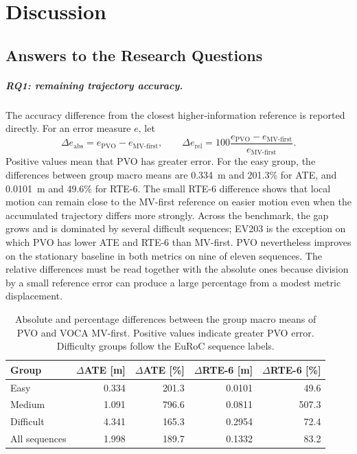 
\chapter{Discussion}\label{chapter:discussion}

\section{Answers to the Research Questions}

\paragraph{RQ1: remaining trajectory accuracy.}
The accuracy difference from the closest higher-information reference is
reported directly. For an error measure $e$, let
\begin{equation}
  \Delta e_{\mathrm{abs}} = e_{\mathrm{PVO}}-e_{\mathrm{MV\text{-}first}},
  \qquad
  \Delta e_{\mathrm{rel}} =
  100\frac{e_{\mathrm{PVO}}-e_{\mathrm{MV\text{-}first}}}
  {e_{\mathrm{MV\text{-}first}}}.
  \label{eq:pvo-reference-error-difference}
\end{equation}
Positive values mean that PVO has greater error. For the easy group, the
differences between group macro means are \SI{0.334}{\metre} and 201.3\% for ATE, and
\SI{0.0101}{\metre} and 49.6\% for RTE-6. The small RTE-6 difference shows that
local motion can remain close to the MV-first reference on easier motion even
when the accumulated trajectory differs more strongly. Across the benchmark,
the gap grows and is dominated by several difficult sequences; EV203 is the
exception on which PVO has lower ATE and RTE-6 than MV-first. PVO nevertheless
improves on the stationary baseline in both metrics on nine of eleven
sequences. The relative differences must be read together with the absolute
ones because division by a small reference error can produce a large
percentage from a modest metric displacement.

\begin{table}[htbp]
  \centering
  \caption[Trajectory-error differences between PVO and VOCA MV-first]{Absolute and percentage differences between the group macro means
  of PVO and VOCA MV-first. Positive values indicate greater PVO error.
  Difficulty groups follow the EuRoC sequence labels.}
  \label{tab:pvo-mv-first-error-differences}
  \begin{tabular}{@{}lrrrr@{}}
    \toprule
    Group & $\Delta$ATE [m] & $\Delta$ATE [\%] & $\Delta$RTE-6 [m] & $\Delta$RTE-6 [\%] \\
    \midrule
    Easy & 0.334 & 201.3 & 0.0101 & 49.6 \\
    Medium & 1.091 & 796.6 & 0.0811 & 507.3 \\
    Difficult & 4.341 & 165.3 & 0.2954 & 72.4 \\
    All sequences & 1.998 & 189.7 & 0.1332 & 83.2 \\
    \bottomrule
  \end{tabular}
\end{table}

